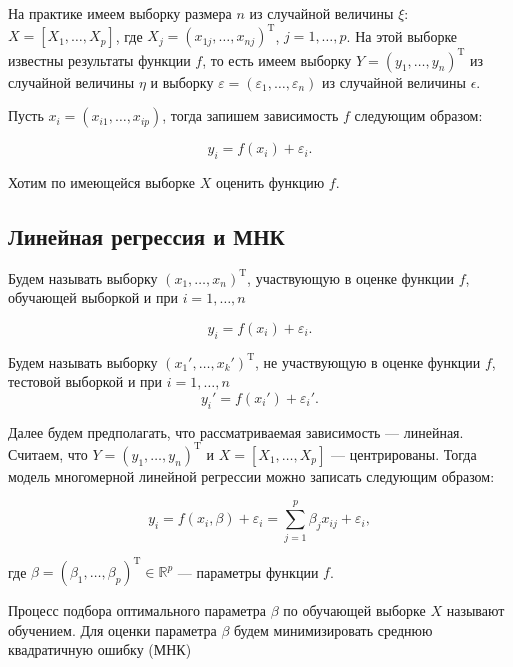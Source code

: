 \documentclass[specialist,
               subf,href,colorlinks=true, 12pt,a4paper]{article} %
\newcommand{\R}{\mathbb{R}}
\newcommand{\T}{\mathrm{T}}
\numberwithin{equation}{section}
\begin{document}
На практике имеем выборку размера $n$ из случайной величины $\xi$: $X = [X_1, \ldots, X_p]$, где $X_j = (x_{1j}, \ldots, x_{nj})^{\T}$, $j = 1, \ldots, p$. На этой выборке известны результаты функции $f$, то есть имеем выборку $Y = (y_1, \ldots , y_n)^{\T}$ из случайной величины $\eta$ и выборку $\varepsilon = (\varepsilon_1, \ldots , \varepsilon_n)$ из случайной величины $\epsilon$.

Пусть $x_i = (x_{i1}, \ldots, x_{ip})$, тогда запишем зависимость $f$ следующим образом:

\begin{equation*}
y_i = f(x_i) + \varepsilon_i.
\end{equation*}

Хотим по имеющейся выборке $X$ оценить функцию $f$.


\subsection{Линейная регрессия и МНК}

Будем называть выборку $(x_1, \ldots, x_n)^{\T}$, участвующую  в оценке функции $f$, обучающей выборкой и при $i = 1, \ldots, n$

\begin{equation*}
y_i = f(x_i) + \varepsilon_i.
\end{equation*} 

Будем называть выборку  $(x_1', \ldots, x_k')^{\T}$, не участвующую в оценке функции $f$, тестовой выборкой и при $i = 1, \ldots, n$
\begin{equation*}
y_i' = f(x_i') + \varepsilon_i'.
\end{equation*} 



Далее будем предполагать, что рассматриваемая зависимость --- линейная. Считаем, что $Y = (y_1, \ldots, y_n)^{\T}$ и $X = [X_1, \ldots ,X_p]$ --- центрированы. Тогда модель многомерной линейной регрессии можно записать следующим образом:

\begin{equation*}
y_i = f(x_i, \beta) + \varepsilon_i = \sum_{j=1}^p \beta_j x_{ij} + \varepsilon_i,
\end{equation*}

где $\beta = (\beta_1, \ldots, \beta_p)^{\T} \in \R^p$ --- параметры функции $f$.

Процесс подбора оптимального параметра $\beta$ по обучающей выборке $X$ называют обучением. Для оценки параметра $\beta$ будем минимизировать среднюю квадратичную ошибку (МНК)
\end{document}
